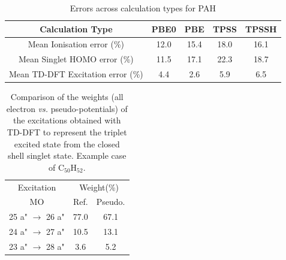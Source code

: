 \documentclass[12pt]{article}
\begin{document}
\begin{table}[h]
\caption{Errors across calculation types for PAH}
\begin{tabular}{c c c c c }
\hline
Calculation Type & PBE0 & PBE & TPSS & TPSSH \\
\hline
Mean Ionisation  error (\%) & 12.0 & 15.4 & 18.0 & 16.1 \\
Mean Singlet HOMO  error (\%) & 11.5 & 17.1 & 22.3 & 18.7 \\
Mean TD-DFT Excitation error (\%) & 4.4 & 2.6 & 5.9 & 6.5 \\ 
\hline
\end{tabular}
\label{table:ring_system_errors}
\end{table}

\newpage
\begin{table}
\caption{\label{tab:coef}Comparison of the weights (all electron \emph{vs.} pseudo-potentials)
of the excitations obtained with TD-DFT
to represent the triplet excited state from the closed shell singlet state.
Example case of C$_{50}$H$_{52}$.}
\begin{tabular}{c c c c}
\hline
\multicolumn{2}{c}{Excitation} & \multicolumn{2}{c}{Weight(\%)}\\
\multicolumn{2}{c}{MO} & Ref. & Pseudo.\\
\hline
\multicolumn{2}{c}{25 a" \(\rightarrow\) 26 a"} & 77.0 &   67.1  \\
\multicolumn{2}{c}{24 a" \(\rightarrow\) 27 a"} & 10.5 &   13.1  \\
\multicolumn{2}{c}{23 a" \(\rightarrow\) 28 a"} & 3.6  &    5.2  \\
\hline
\end{tabular}
\end{table}
\end{document}
